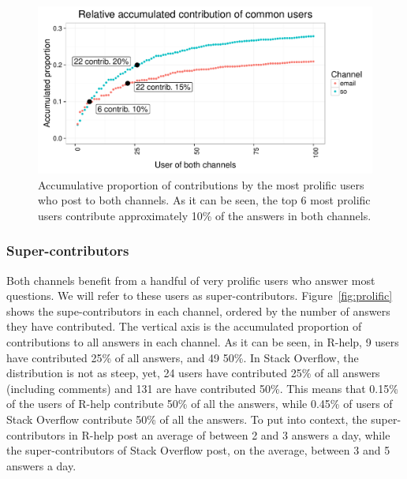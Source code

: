 \documentclass[smallextended]{svjour3}       %
\newcommand{\SO}{Stack Overflow\xspace}
\newcommand{\RH}{R-help\xspace}
\begin{document}
\begin{figure}[htbp]
  \centering
  \includegraphics[width=.95\textwidth]{figs/common.pdf}
  \caption{Accumulative proportion of contributions by the most prolific users who post to both channels. As it can be seen, the top 6
    most prolific users contribute approximately 10\% of the answers in both channels.}
  \label{fig:common}
\end{figure}

\subsubsection{Super-contributors}

Both channels benefit from a handful of very prolific users who answer most questions. We will refer to these users as
super-contributors. Figure~\ref{fig:prolific} shows the supe-contributors in each channel, ordered by the number of
answers they have contributed. The vertical axis is the accumulated proportion of contributions to all answers in
each channel. As it can be seen, in \RH, 9 users have contributed 25\% of all answers, and 49 50\%. In \SO, the distribution is not as
steep, yet, 24 users have contributed 25\% of all answers (including comments) and 131 are have contributed 50\%. This
means that 0.15\% of the users of \RH contribute 50\% of all the answers, while 0.45\% of users of \SO contribute 50\%
of all the answers. To put into context, the super-contributors in \RH post an average of between 2 and 3 answers a day, while the
super-contributors of \SO post, on the average, between 3 and 5 answers a day.
\end{document}
